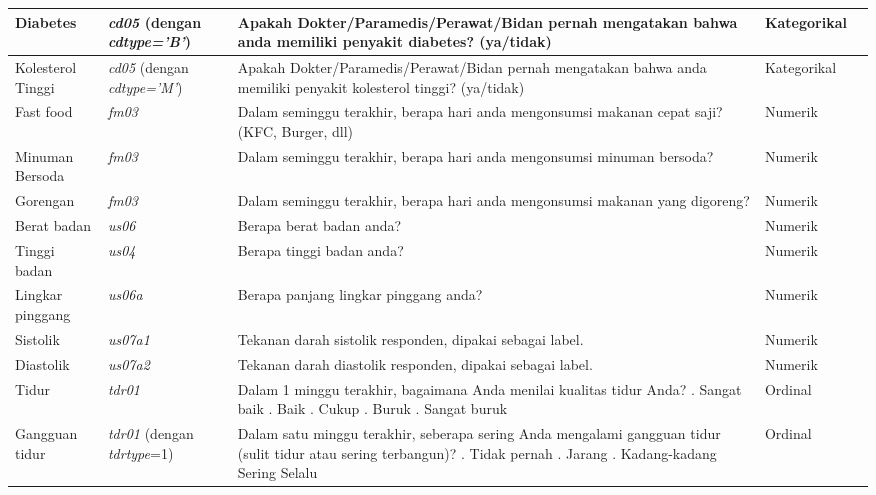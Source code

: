 \begin{longtable}{|p{2.5cm}|p{3cm}|p{3.5cm}|p{5.5cm}|p{2cm}|}
Diabetes & \textit{cd05} (dengan \textit{cdtype='B'}) & Apakah Dokter/Paramedis/Perawat/Bidan pernah mengatakan bahwa anda memiliki penyakit diabetes? (ya/tidak) & Kategorikal \\ \hline

Kolesterol Tinggi & \textit{cd05} (dengan \textit{cdtype='M'}) & Apakah Dokter/Paramedis/Perawat/Bidan pernah mengatakan bahwa anda memiliki penyakit kolesterol tinggi? (ya/tidak) & Kategorikal \\ \hline

Fast food & \textit{fm03} & Dalam seminggu terakhir, berapa hari anda mengonsumsi makanan cepat saji? (KFC, Burger, dll) & Numerik \\ \hline

Minuman Bersoda & \textit{fm03} & Dalam seminggu terakhir, berapa hari anda mengonsumsi minuman bersoda? & Numerik \\ \hline

Gorengan & \textit{fm03} & Dalam seminggu terakhir, berapa hari anda mengonsumsi makanan yang digoreng? & Numerik \\ \hline

Berat badan & \textit{us06} & Berapa berat badan anda? & Numerik \\ \hline

Tinggi badan & \textit{us04} & Berapa tinggi badan anda? & Numerik \\ \hline

Lingkar pinggang & \textit{us06a} & Berapa panjang lingkar pinggang anda? & Numerik \\ \hline

Sistolik & \textit{us07a1} & Tekanan darah sistolik responden, dipakai sebagai label. & Numerik \\ \hline

Diastolik & \textit{us07a2} & Tekanan darah diastolik responden, dipakai sebagai label. & Numerik \\ \hline

Tidur & \textit{tdr01} & Dalam 1 minggu terakhir, bagaimana Anda menilai kualitas tidur Anda? \newline 1. Sangat baik \newline 2. Baik \newline 3. Cukup \newline 4. Buruk \newline 5. Sangat buruk & Ordinal \\ \hline

Gangguan tidur & \textit{tdr01} (dengan \textit{tdrtype}=1) & Dalam satu minggu terakhir, seberapa sering Anda mengalami gangguan tidur (sulit tidur atau sering terbangun)? \newline 1. Tidak pernah \newline 2. Jarang \newline 3. Kadang-kadang \newline Sering \newline Selalu & Ordinal \\ \hline
\end{longtable}
